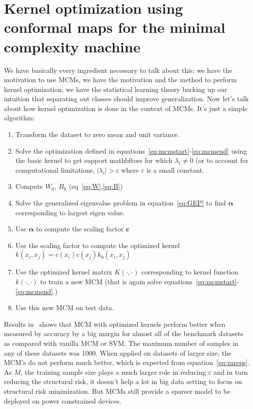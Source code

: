\documentclass[11pt]{article}
\begin{document}
\section{Kernel optimization using conformal maps for the minimal complexity
machine~\cite{keropt}}
We have basically every ingredient necessary to talk about this: we have the
motivation to use MCMs, we have the motivation and the method to perform
kernel optimization, we have the statistical learning theory backing up our
intuition that separating out classes should improve generalization. Now let's talk about how
kernel optimization is done in the context of MCMs. It's just a simple
algorithm:
\begin{enumerate}
    \item Transform the dataset to zero mean and unit variance.
    \item Solve the optimization defined in
        equations~\ref{eq:mcmstart}-\ref{eq:mcmend} using the basic kernel to
        get support mathbftors for which $\lambda_i \ne 0$ (or to account for
        computational limitations, $\lvert\lambda_i\rvert > \varepsilon$ where
        $\varepsilon$ is a small constant.
    \item Compute $W_0$, $B_0$ (eq~\ref{eq:W},\ref{eq:B})
    \item Solve the generalized eigenvalue problem in equation~\ref{eq:GEP} to
        find $\mathbf{\alpha}$ corresponding to largest eigen value.
    \item Use $\mathbf{\alpha}$ to compute the scaling factor $\mathbf{c}$
    \item Use the scaling factor to compute the optimized kernel
        $k(x_i,x_j)=c(x_i)c(x_j)k_0(x_i,x_j)$
    \item Use the optimized kernel matrix $K(\cdot,\cdot)$ corresponding to
        kernel function $k(\cdot,\cdot)$ to train a new MCM (that is again solve
        equations~\ref{eq:mcmstart}-\ref{eq:mcmend}.)
    \item Use this new MCM on test data.
\end{enumerate}
\par
Results in~\cite{keropt} shows that MCM with optimized kernels perform better when
measured by accuracy by a big margin for almost all of the benchmark datasets as
compared with vanilla MCM or SVM.  The maximum number of samples in any of these
datasets was 1000. When applied on datasets of larger size, the MCM's do not
perform much better, which is expected from equation~\ref{eq:vareps}. As $M$,
the training sample size plays a much larger role in reducing $\varepsilon$ and
in turn reducing the structural risk, it doesn't help a lot in big data setting
to focus on structural risk minimization. But MCMs still provide a sparser model
to be deployed on power constrained devices.
\afterpage{\clearpage}
\end{document}
